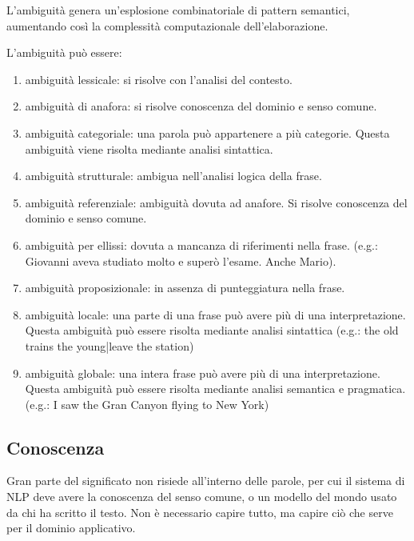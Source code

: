L'ambiguità genera un'esplosione combinatoriale di pattern semantici, aumentando così la complessità computazionale dell'elaborazione.

L'ambiguità può essere:

\begin{enumerate}
	
	\item ambiguità lessicale: si risolve con l'analisi del contesto.
	
	\item ambiguità di anafora: si risolve conoscenza del dominio e senso comune.
	
	\item ambiguità categoriale: una parola può appartenere a più categorie. Questa ambiguità viene risolta mediante analisi sintattica.
	
	\item ambiguità strutturale: ambigua nell'analisi logica della frase.
	
	\item ambiguità referenziale: ambiguità dovuta ad anafore. Si risolve conoscenza del dominio e senso comune.
	
	\item ambiguità per ellissi: dovuta a mancanza di riferimenti nella frase. (e.g.: Giovanni aveva studiato molto e superò l’esame. Anche
	Mario).
	
	\item ambiguità proposizionale: in assenza di punteggiatura nella frase.
	
	\item ambiguità locale: una parte di una frase può avere più di una interpretazione. Questa ambiguità può essere risolta mediante analisi sintattica (e.g.: the old trains {the young|leave the station})
	
	\item ambiguità globale: una intera frase può avere più di una interpretazione. Questa ambiguità può essere risolta mediante analisi semantica e pragmatica. (e.g.: I saw the Gran Canyon flying to New York)
\end{enumerate}


\subsection{Conoscenza}
Gran parte del significato non risiede all’interno delle parole, per cui il sistema di NLP deve avere la conoscenza del senso comune, o un modello del mondo usato da chi ha scritto il testo.
Non è necessario capire tutto, ma capire ciò che serve per il dominio applicativo.


